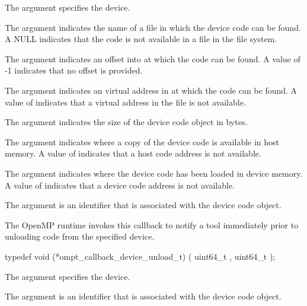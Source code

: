 \argdesc
The argument  specifies the device. 

The argument  indicates the name of a file in which the device code can be found. A NULL  indicates that the code is not available in a file in the file system.

The argument  indicates an offset into  at which the code can be found. A value of -1 indicates that
no offset is provided.

The argument  indicates an virtual address in  at which the code can be found. 
A value of  indicates that a virtual address in the file is not available.

The argument  indicates the size of the device code object in bytes.

The argument  indicates where a copy of the device code is available in host memory.
A value of  indicates that a host code address is not available.

The argument  indicates where the device code has been loaded in device memory. 
A value of  indicates that a device code address is not available.

The argument  is an identifier that is associated with the device code object. 


\label{sec:ompt_callback_device_unload_t}

\summary
The OpenMP runtime invokes this callback to notify a tool immediately prior to unloading code from the specified device.

\format


\begin{ccppspecific}
\begin{omptCallback}
typedef void (*ompt_callback_device_unload_t) (
  uint64_t ,
  uint64_t 
);
\end{omptCallback}

\end{ccppspecific}


\argdesc

The argument  specifies the device. 

The argument  is an identifier that is associated with the device code object. 


